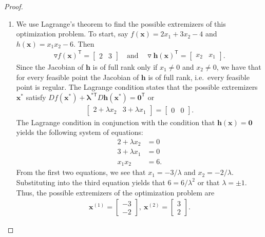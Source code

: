 \documentclass[12pt]{article}
\theoremstyle{definition}
\newcommand{\vc}[1]{\boldsymbol{#1}}
\newcommand{\tran}{\mathsf{T}}
\begin{document}
\begin{proof}
  \begin{enumerate}
    \item We use Lagrange's theorem to find the possible extremizers of this optimization problem.
      To start, say $f(\vc{x}) = 2x_1 + 3x_2 - 4$ and $h(\vc{x}) = x_1 x_2 - 6$.
      Then
      \begin{align*}
        \triangledown f(\vc{x})^\tran = \begin{bmatrix}2 & 3\end{bmatrix}
        \quad \text{and} \quad
        \triangledown \vc{h}(\vc{x})^\tran = \begin{bmatrix}x_2 & x_1\end{bmatrix}.
      \end{align*}
      Since the Jacobian of $\vc{h}$ is of full rank only if $x_1 \neq 0$ and $x_2 \neq 0$, we have that for every
      feasible point the Jacobian of $\vc{h}$ is of full rank, i.e.\ every feasible point is regular.
      The Lagrange condition states that the possible extremizers $\vc{x}^{*}$ satisfy $D f(\vc{x}^*) + \vc{\lambda}^{*\tran} D \vc{h}(\vc{x}^*) = \vc{0}^\tran$
      or
      \begin{align*}
        \begin{bmatrix}2 + \lambda x_2 & 3 + \lambda x_1\end{bmatrix} = \begin{bmatrix}0 & 0\end{bmatrix}.
      \end{align*}
      The Lagrange condition in conjunction with the condition that $\vc{h}(\vc{x}) = \vc{0}$ yields the following
      system of equations:
      \begin{align*}
        2 + \lambda x_2 &= 0 \\
        3 + \lambda x_1 &= 0 \\
        x_1 x_2 &= 6.
      \end{align*}
      From the first two equations, we see that $x_1 = -3/\lambda$ and $x_2 = -2/\lambda$. Substituting into the
      third equation yields that $6 = 6/\lambda^2$ or that $\lambda=\pm 1$. Thus, the possible extremizers of
      the optimization problem are
      \begin{align}\label{extremizers}
        \vc{x}^{(1)} = \begin{bmatrix}-3 \\ -2\end{bmatrix} ,\
        \vc{x}^{(2)} = \begin{bmatrix}3 \\ 2\end{bmatrix}.

\end{align}
\end{enumerate}
\end{proof}
\end{document}
